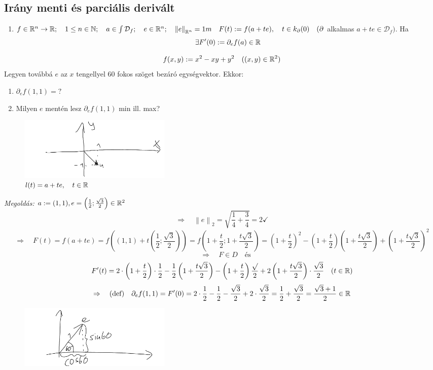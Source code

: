 \documentclass[a4paper,11.5pt]{article}
\newcommand{\norm}[1]{\left\lVert#1\right\rVert}
\begin{document}
	\subsection{Irány menti és parciális derivált}
	\begin{revision}
		\begin{enumerate} 
			\item $f\in\R{^n}\to\R;\quad 1\leq n\in\N;\quad a\in\int\mathcal{D}_f;\quad e\in\R^n;\quad \norm{e}_{\R^n}=1 m\quad F(t):=f(a+te),\quad t\in k_\partial(0)\quad (\partial$ alkalmas $a+te\in\mathcal{D}_f).$ Ha
			\[ \exists F'(0):=\partial_ef(a)\in\mathbb{R} \]
		\end{enumerate}
	\end{revision}
	\begin{task}
		\[ f(x,y):=x^2-xy+y^2\quad ((x,y)\in\mathbb{R}^2) \]
		Legyen továbbá $e$ az $x$ tengellyel 60 fokos szöget bezáró egységvektor.
		Ekkor:
		\begin{enumerate}
			\item $\partial_{e}f(1,1)=?$
			\item Milyen $e$ mentén lesz $\partial_{e}f(1,1)$ min ill. max?
		\end{enumerate}
		\begin{figure}[H]
			\centering
			\includegraphics[height=3cm]{kepek/07.png}
			\caption{$l(t)=a+te,\quad  t\in\mathbb{R}$}
		\end{figure}
		\textit{Megoldás:} $a:=(1,1), e=\left(\frac{1}{2};\frac{\sqrt{3}}{2}\right)\in\mathbb{R}^2$
		\[ \Rightarrow\quad \norm{e}_2=\sqrt{\frac{1}{4}+\frac{3}{4}}=2\checkmark \]
		\[ \Rightarrow \quad F(t)=f(a+te)=f((1,1)+t\left(\frac{1}{2};\frac{\sqrt{3}}{2}\right))=f\left(1+\frac{t}{2};1+\frac{t\sqrt{3}}{2}\right)=\left(1+\frac{t}{2}\right)^2-\left(1+\frac{t}{2}\right)\left(1+\frac{t\sqrt{3}}{2}\right)+\left(1+\frac{t\sqrt{3}}{2}\right)^2\]
		\[\quad \Rightarrow\quad F\in D\quad \text{és} \]
		\[ F'(t)=2\cdot\left(1+\frac{t}{2}\right)\cdot\frac{1}{2}-\frac{1}{2}\left(1+\frac{t\sqrt{3}}{2}\right)-\left(1+\frac{t}{2}\right)\frac{\sqrt{}}{2}+2\left(1+\frac{t\sqrt{3}}{2}\right)\cdot\frac{\sqrt{3}}{2}\quad (t\in\mathbb{R}) \]
		\[\Rightarrow\quad \text{(def)}\quad \partial_ef(1,1)=F'(0)=2\cdot\frac{1}{2}-\frac{1}{2}-\frac{\sqrt{3}}{2}+2\cdot\frac{\sqrt{3}}{2}=\frac{1}{2}+\frac{\sqrt{3}}{2}=\frac{\sqrt{3}+1}{2}\in\mathbb{R} \]
		\begin{figure}[H]
			\centering
			\includegraphics[height=3cm]{kepek/02.png}
			\caption{}
		\end{figure}
		
	\end{task}
\end{document}

